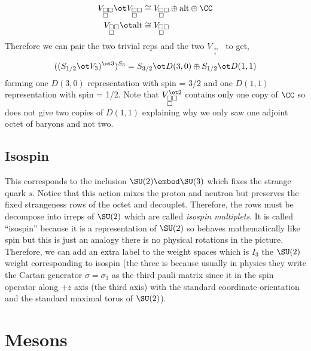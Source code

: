 \documentclass[12pt]{article}
\begin{document}
\begin{align*}
V_{\substack{\square \square \\ \square \,\,\,\,}} \ot V_{\substack{\square \square \\ \square \,\,\,\,}} & \cong V_{\substack{\square \square \\ \square \,\,\,\,}} \oplus \alt \oplus \CC
\\
V_{\substack{\square \square \\ \square \,\,\,\,}} \ot \alt & \cong V_{\substack{\square \square \\ \square \,\,\,\,}}
\end{align*}
Therefore we can pair the two trivial reps and the two $V_{\substack{\square \square \\ \square \,\,\,\,}}$ to get,
\[ ((S_{1/2} \ot V_3)^{\ot 3})^{S_3} = S_{3/2} \ot D(3,0) \oplus S_{1/2} \ot D(1,1) \]
forming one $D(3,0)$ representation with spin = 3/2 and one $D(1,1)$ representation with spin = 1/2. Note that $V_{\substack{\square \square \\ \square \,\,\,\,}}^{\ot 2}$ contains only one copy of $\CC$ so does not give two copies of $D(1,1)$ explaining why we only saw one adjoint octet of baryons and not two.

\subsection{Isospin}

This corresponds to the inclusion $\SU(2) \embed \SU(3)$ which fixes the strange quark $s$. Notice that this action mixes the proton and neutron but preserves the fixed strangeness rows of the octet and decouplet. Therefore, the rows must be decompose into irreps of $\SU(2)$ which are called \textit{isospin multiplets}. It is called ``isospin'' because it is a representation of $\SU(2)$ so behaves mathematically like spin but this is just an analogy there is no physical rotations in the picture. Therefore, we can add an extra label to the weight spaces which is $I_3$ the $\SU(2)$ weight corresponding to isospin (the three is because usually in physics they write the Cartan generator $\sigma = \sigma_3$ as the third pauli matrix since it in the spin operator along $+z$ axis (the third axis) with the standard coordinate orientation and the standard maximal torus of $\SU(2)$).

\section{Mesons}
\end{document}

